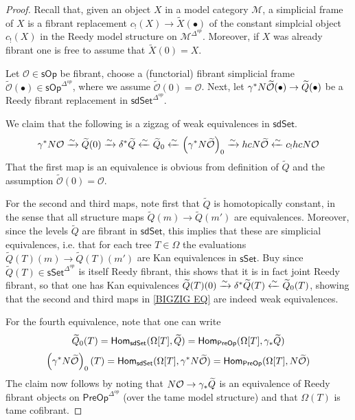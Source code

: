 \documentclass[a4paper,10pt
,draft
]{article}%
\renewcommand{\1}{\ensuremath{\mathbb{id}}}
\begin{document}
\begin{proof}
	Recall that, given an object $X$ in a model category $\mathcal{M}$, a simplicial frame of $X$ is a fibrant replacement
	$c_!(X) \to \widetilde{X}(\bullet)$ of the constant 
	simplcial object $c_!(X)$ in the Reedy model structure on $\mathcal{M}^{\Delta^{op}}$.
	Moreover, if $X$ was already fibrant one is free to assume that $\widetilde{X}(0) = X$.
	
	Let $\mathcal{O} \in \mathsf{sOp}$ be fibrant, 
	choose a (functorial) fibrant simplicial frame
	$\widetilde{\mathcal{O}}(\bullet) \in \mathsf{sOp}^{\Delta^{op}}$, where we assume $\widetilde{\mathcal{O}} (0) = \mathcal{O}$.
	Next, let 
	$\gamma^{\**} N \widetilde{\mathcal{O}}(\bullet) 
	\to \widetilde{Q}(\bullet)$
	be a Reedy fibrant replacement in  
	$\mathsf{sdSet}^{\Delta^{op}}$.
	
	We claim that the following is a zigzag of weak equivalences in $\mathsf{sdSet}$.
\begin{equation}\label{BIGZIG EQ}
	\gamma^{\**} N \mathcal{O} \xrightarrow{\sim}
	\widetilde{Q}(0) \xrightarrow{\sim}
	\delta^{\**} \widetilde{Q} \xleftarrow{\sim}
	\widetilde{Q}_0 \xleftarrow{\sim}
	\left(\gamma^{\**} N \widetilde{\mathcal{O}}\right)_0
	\xrightarrow{\sim}
	hcN \widetilde{\mathcal{O}} \xleftarrow{\sim}
	c_{!} hcN \mathcal{O}
\end{equation}
That the first map is an equivalence is obvious from definition of $\widetilde{Q}$ and the assumption $\widetilde{\mathcal{O}}(0) = \mathcal{O}$.

For the second and third maps, note first that $\widetilde{Q}$ is homotopically constant, in the sense that all structure maps $\widetilde{Q}(m) \to \widetilde{Q}(m')$
are equivalences.
Moreover, since the levels $\widetilde{Q}$ are fibrant in 
$\mathsf{sdSet}$, this implies that these are simplicial equivalences, i.e. that for each tree $T \in \Omega$
the evaluations 
$\widetilde{Q}(T)(m) \to \widetilde{Q}(T)(m')$
are Kan equivalences in $\mathsf{sSet}$.
Buy since $\widetilde{Q}(T) \in \mathsf{sSet}^{\Delta^{op}}$ is itself Reedy fibrant, this shows that it is in fact joint Reedy fibrant, so that one has Kan equivalences 
$\widetilde{Q}(T)(0) \xrightarrow{\sim}
\delta^{\**} \widetilde{Q}(T) \xleftarrow{\sim}
\widetilde{Q}_0(T)$, showing that the second and third maps in \eqref{BIGZIG EQ} are indeed weak equivalences.

For the fourth equivalence, note that one can write
\[\widetilde{Q}_0(T) = 
\mathsf{Hom}_{\mathsf{sdSet}}(\Omega[T],\widetilde{Q})=
\mathsf{Hom}_{\mathsf{PreOp}}(\Omega[T],\gamma_{\**}\widetilde{Q})\]
\[
\left(\gamma^{\**} N \widetilde{\mathcal{O}}\right)_0(T) = 
\mathsf{Hom}_{\mathsf{sdSet}}(\Omega[T],\gamma^{\**} N \widetilde{\mathcal{O}})=
\mathsf{Hom}_{\mathsf{PreOp}}(\Omega[T], N \widetilde{\mathcal{O}})
\]
The claim now follows by noting that
$N \mathcal{O} \to \gamma_{\**} \widetilde{Q}$
is an equivalence of Reedy fibrant objects on 
$\mathsf{PreOp}^{\Delta^{op}}$ (over the tame model structure) and that $\Omega(T)$ is tame cofibrant. 


\end{proof}
\end{document}
